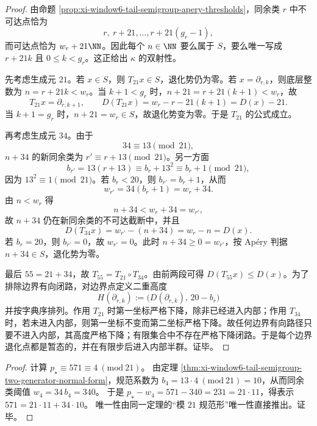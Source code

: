 \begin{proof}
由命题 \ref{prop:xi-window6-tail-semigroup-apery-thresholds}，同余类 \(r\) 中不可达点恰为
\[
r,\ r+21,\ldots,r+21(g_r-1),
\]
而可达点恰为 \(w_r+21\NN\)。因此每个 \(n\in\NN\) 要么属于 \(S\)，要么唯一写成 \(r+21k\) 且 \(0\le k<g_r\)。这正给出 \(\kappa\) 的双射性。

先考虑生成元 \(21\)。若 \(x\in S\)，则 \(T_{21}x\in S\)，退化势仍为零。若 \(x=\partial_{r,k}\)，则底层整数为 \(n=r+21k<w_r\)。当 \(k+1<g_r\) 时，\(n+21=r+21(k+1)<w_r\)，故
\[
T_{21}x=\partial_{r,k+1},\qquad D(T_{21}x)=w_r-r-21(k+1)=D(x)-21.
\]
当 \(k+1=g_r\) 时，\(n+21=w_r\in S\)，故退化势变为零。于是 \(T_{21}\) 的公式成立。

再考虑生成元 \(34\)。由于
\[
34\equiv 13\pmod {21},
\]
\(n+34\) 的新同余类为 \(r'\equiv r+13\pmod {21}\)。另一方面
\[
b_{r'}=13(r+13)\equiv b_r+13^2\equiv b_r+1\pmod {21},
\]
因为 \(13^2\equiv1\pmod {21}\)。若 \(b_r<20\)，则 \(b_{r'}=b_r+1\)，从而
\[
w_{r'}=34(b_r+1)=w_r+34.
\]
由 \(n<w_r\) 得
\[
n+34<w_r+34=w_{r'},
\]
故 \(n+34\) 仍在新同余类的不可达截断中，并且
\[
D(T_{34}x)=w_{r'}-(n+34)=w_r-n=D(x).
\]
若 \(b_r=20\)，则 \(b_{r'}=0\)，故 \(w_{r'}=0\)。此时 \(n+34\ge0=w_{r'}\)，按 Ap\'ery 判据 \(n+34\in S\)，退化势为零。

最后 \(55=21+34\)，故 \(T_{55}=T_{21}\circ T_{34}\)。由前两段可得 \(D(T_{55}x)\le D(x)\)。为了排除边界有向闭路，对边界点定义二重高度
\[
H(\partial_{r,k}):=\bigl(D(\partial_{r,k}),\,20-b_r\bigr)
\]
并按字典序排列。作用 \(T_{21}\) 时第一坐标严格下降，除非已经进入内部；作用 \(T_{34}\) 时，若未进入内部，则第一坐标不变而第二坐标严格下降。故任何边界有向路径只要不进入内部，其高度严格下降；有限集合中不存在严格下降闭路。于是每个边界退化点都是暂态的，并在有限步后进入内部半群。证毕。
\end{proof}


\begin{proof}
计算 \(p_\star\equiv 571\equiv 4\ (\mathrm{mod}\ 21)\)。
由定理 \ref{thm:xi-window6-tail-semigroup-two-generator-normal-form}，规范系数为
\(
b_{4}=13\cdot 4\ (\mathrm{mod}\ 21)=10
\)，从而同余类阈值 \(w_4=34\,b_4=340\)。
于是
\(
p_\star-w_4=571-340=231=21\cdot 11
\)，得表示 \(571=21\cdot 11+34\cdot 10\)。
唯一性由同一定理的“模 \(21\) 规范形”唯一性直接推出。证毕。
\end{proof}
